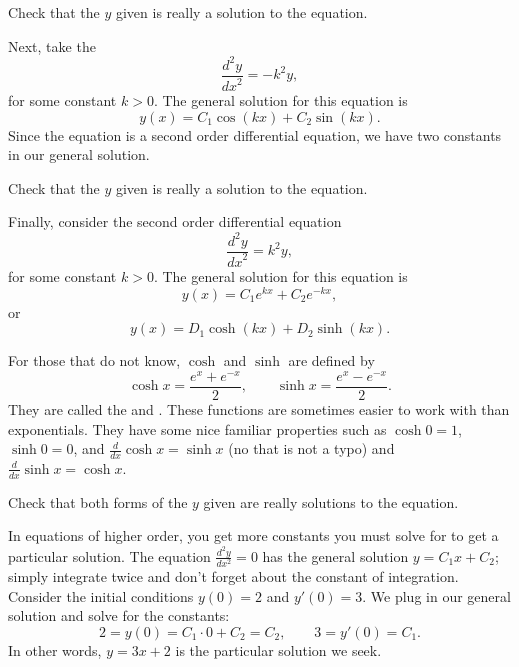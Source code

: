 \begin{exercise}
Check that the $y$ given is really a solution to the equation.
\end{exercise}

Next, take the
\emph{}
\begin{equation*}
\frac{d^2y}{{dx}^2} = -k^2 y ,
\end{equation*}
for some constant $k > 0$.
The general solution for this equation is
\begin{equation*}
y(x) = C_1 \cos(kx) + C_2 \sin(kx) .
\end{equation*}
Since the equation is a second order differential equation,
we have two constants in our general solution.

\begin{exercise}
Check that the $y$ given is really a solution to the equation.
\end{exercise}

Finally, consider the second order differential equation
\begin{equation*}
\frac{d^2y}{{dx}^2} = k^2 y ,
\end{equation*}
for some constant $k > 0$.
The general solution for this equation is
\begin{equation*}
y(x) = C_1 e^{kx} + C_2 e^{-kx} ,
\end{equation*}
or
\begin{equation*}
y(x) = D_1 \cosh(kx) + D_2 \sinh(kx) .
\end{equation*}

For those that do not know, $\cosh$ and $\sinh$ are defined by
\begin{equation*}
\cosh x = \frac{e^{x} + e^{-x}}{2} , \qquad
\sinh x = \frac{e^{x} - e^{-x}}{2} .
\end{equation*}
They are called the
\emph{}
and
\emph{}.
These functions are sometimes easier to
work with than exponentials.  They have some nice familiar
properties such as
$\cosh 0 = 1$, $\sinh 0 = 0$, and $\frac{d}{dx} \cosh x = \sinh x$ (no that is
not a typo)
and $\frac{d}{dx} \sinh x = \cosh x$.

\begin{exercise}
Check that both forms of the $y$ given are
really solutions to the equation.
\end{exercise}

\begin{example}
In equations of higher order, you get more constants you must solve for to
get a particular solution.  The equation $\frac{d^2y}{dx^2} = 0$ has the
general solution $y = C_1 x + C_2$; simply integrate twice and don't forget
about the constant of integration.  Consider the initial conditions $y(0) =
2$ and $y'(0) = 3$.  We plug in our general solution and solve for the
constants:
\begin{equation*}
2 = y(0) = C_1 \cdot 0 + C_2 = C_2, \qquad
3 = y'(0) = C_1 .
\end{equation*}
In other words, $y = 3x + 2$ is the particular solution we seek.
\end{example}



